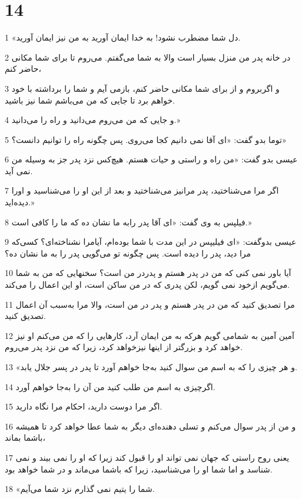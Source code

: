 \chapter{14}

\par 1 «دل شما مضطرب نشود! به خدا ایمان آورید به من نیز ایمان آورید.
\par 2 در خانه پدر من منزل بسیار است والا به شما می‌گفتم. می‌روم تا برای شما مکانی حاضر کنم،
\par 3 و اگربروم و از برای شما مکانی حاضر کنم، بازمی آیم و شما را برداشته با خود خواهم برد تا جایی که من می‌باشم شما نیز باشید.
\par 4 و جایی که من می‌روم می‌دانید و راه را می‌دانید.»
\par 5 توما بدو گفت: «ای آقا نمی دانیم کجا می‌روی. پس چگونه راه را توانیم دانست؟»
\par 6 عیسی بدو گفت: «من راه و راستی و حیات هستم. هیچ‌کس نزد پدر جز به وسیله من نمی آید.
\par 7 اگر مرا می‌شناختید، پدر مرانیز می‌شناختید و بعد از این او را می‌شناسید و اورا دیده‌اید.»
\par 8 فیلپس به وی گفت: «ای آقا پدر رابه ما نشان ده که ما را کافی است.»
\par 9 عیسی بدوگفت: «ای فیلیپس در این مدت با شما بوده‌ام، آیامرا نشناخته‌ای؟ کسی‌که مرا دید، پدر را دیده است. پس چگونه تو می‌گویی پدر را به ما نشان ده؟
\par 10 آیا باور نمی کنی که من در پدر هستم و پدردر من است؟ سخنهایی که من به شما می‌گویم ازخود نمی گویم، لکن پدری که در من ساکن است، او این اعمال را می‌کند.
\par 11 مرا تصدیق کنید که من در پدر هستم و پدر در من است، والا مرا به‌سبب آن اعمال تصدیق کنید.
\par 12 آمین آمین به شمامی گویم هر‌که به من ایمان آرد، کارهایی را که من می‌کنم او نیز خواهد کرد و بزرگتر از اینها نیزخواهد کرد، زیرا که من نزد پدر می‌روم.
\par 13 «و هر چیزی را که به اسم من سوال کنید به‌جا خواهم آورد تا پدر در پسر جلال یابد.
\par 14 اگرچیزی به اسم من طلب کنید من آن را به‌جا خواهم آورد.
\par 15 اگر مرا دوست دارید، احکام مرا نگاه دارید.
\par 16 و من از پدر سوال می‌کنم و تسلی دهنده‌ای دیگر به شما عطا خواهد کرد تا همیشه باشما بماند،
\par 17 یعنی روح راستی که جهان نمی تواند او را قبول کند زیرا که او را نمی بیند و نمی شناسد و اما شما او را می‌شناسید، زیرا که باشما می‌ماند و در شما خواهد بود.
\par 18 «شما را یتیم نمی گذارم نزد شما می‌آیم.

